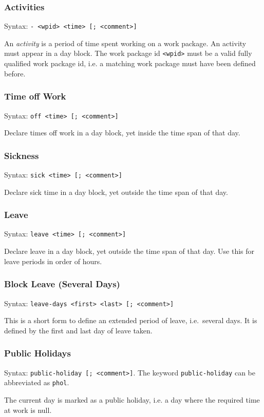 \documentclass[11pt]{article}
\begin{document}

\subsubsection{Activities}

Syntax: \verb:- <wpid> <time> [; <comment>]:

An \emph{activity} is a period of time spent working on a work package. An activity must appear in a day block. The work package id \verb:<wpid>: must be a valid fully qualified work package id, i.e. a matching work package must have been defined before.

\subsubsection{Time off Work}

Syntax: \verb:off <time> [; <comment>]:

Declare times off work in a day block, yet inside the time span of that day.
 
\subsubsection{Sickness}

Syntax: \verb:sick <time> [; <comment>]:

Declare sick time in a day block, yet outside the time span of that day.

\subsubsection{Leave}

Syntax: \verb:leave <time> [; <comment>]:

Declare leave in a day block, yet outside the time span of that day. Use this for leave periods in order of hours.

\subsubsection{Block Leave (Several Days)}

Syntax: \verb:leave-days <first> <last> [; <comment>]:

This is a short form to define an extended period of leave, i.e.\ several days. It is defined by the first and last day of leave taken.

\subsubsection{Public Holidays}

Syntax: \verb:public-holiday [; <comment>]:.
The keyword \verb:public-holiday: can be abbreviated as \verb:phol:.

The current day is marked as a public holiday, i.e. a day where the required time at work is null.
\end{document}
